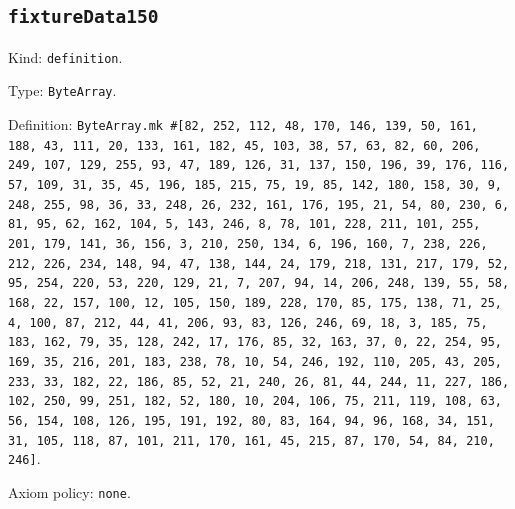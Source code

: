 \documentclass[11pt]{article}
\begin{document}
\subsection*{\texttt{fixtureData150}}
\noindent Kind: \texttt{definition}.\par
\noindent Type: \texttt{ByteArray}.\par
\noindent Definition: \texttt{ByteArray.mk \#[82, 252, 112, 48, 170, 146, 139, 50, 161, 188, 43, 111, 20, 133, 161, 182, 45, 103, 38, 57, 63, 82, 60, 206, 249, 107, 129, 255, 93, 47, 189, 126, 31, 137, 150, 196, 39, 176, 116, 57, 109, 31, 35, 45, 196, 185, 215, 75, 19, 85, 142, 180, 158, 30, 9, 248, 255, 98, 36, 33, 248, 26, 232, 161, 176, 195, 21, 54, 80, 230, 6, 81, 95, 62, 162, 104, 5, 143, 246, 8, 78, 101, 228, 211, 101, 255, 201, 179, 141, 36, 156, 3, 210, 250, 134, 6, 196, 160, 7, 238, 226, 212, 226, 234, 148, 94, 47, 138, 144, 24, 179, 218, 131, 217, 179, 52, 95, 254, 220, 53, 220, 129, 21, 7, 207, 94, 14, 206, 248, 139, 55, 58, 168, 22, 157, 100, 12, 105, 150, 189, 228, 170, 85, 175, 138, 71, 25, 4, 100, 87, 212, 44, 41, 206, 93, 83, 126, 246, 69, 18, 3, 185, 75, 183, 162, 79, 35, 128, 242, 17, 176, 85, 32, 163, 37, 0, 22, 254, 95, 169, 35, 216, 201, 183, 238, 78, 10, 54, 246, 192, 110, 205, 43, 205, 233, 33, 182, 22, 186, 85, 52, 21, 240, 26, 81, 44, 244, 11, 227, 186, 102, 250, 99, 251, 182, 52, 180, 10, 204, 106, 75, 211, 119, 108, 63, 56, 154, 108, 126, 195, 191, 192, 80, 83, 164, 94, 96, 168, 34, 151, 31, 105, 118, 87, 101, 211, 170, 161, 45, 215, 87, 170, 54, 84, 210, 246]}.\par
\noindent Axiom policy: \texttt{none}.\par
\end{document}
